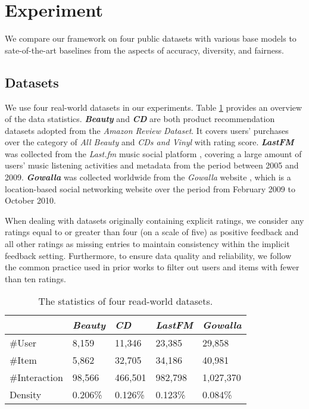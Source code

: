 \section{Experiment}
We compare our framework on four public datasets with various base models to sate-of-the-art baselines from the aspects of accuracy, diversity, and fairness.
\subsection{Datasets}
We use four real-world datasets in our experiments. Table \ref{tab:DataStatistics} provides an overview of the data statistics. \textbf{\textit{Beauty}} and \textbf{\textit{CD}} are both product recommendation datasets adopted from the \textit{Amazon Review Dataset}\cite{he2016ups}. It covers users' purchases over the category of \textit{All Beauty} and \textit{CDs and Vinyl} with rating score. \textbf{\textit{LastFM}} was collected from the \textit{Last.fm} music social platform \cite{Celma:Springer2010}, covering a large amount of users' music listening activities and metadata from the period between 2005 and 2009. \textbf{\textit{Gowalla}} was collected worldwide from the \textit{Gowalla} website \cite{cho2011friendship}, which is a location-based social networking website over the period from February 2009 to October 2010.

When dealing with datasets originally containing explicit ratings, we consider any ratings equal to or greater than four (on a scale of five) as positive feedback and all other ratings as missing entries to maintain consistency within the implicit feedback setting. Furthermore, to ensure data quality and reliability, we follow the common practice used in prior works to filter out users and items with fewer than ten ratings. 

\begin{table}[h]
    \centering
    \small
    \caption{The statistics of four read-world datasets.}
    \label{tab:DataStatistics}
    \begin{tabular}{lllll}
        \toprule
                & \textit{Beauty}  & \textit{CD} & \textit{LastFM}  & \textit{Gowalla} \\ \midrule
       
        \#User    & 8,159    & 11,346    & 23,385   & 29,858   \\ \hline
        \#Item    & 5,862    & 32,705    & 34,186   & 40,981   \\ \hline
        \#Interaction & 98,566   & 466,501  & 982,798  & 1,027,370 \\ \hline
        Density   & 0.206\% & 0.126\%  & 0.123\% & 0.084\% \\ \bottomrule
    \end{tabular}
\end{table}


